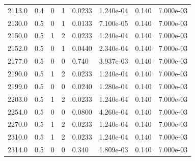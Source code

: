 \documentclass[preview]{standalone}
\begin{document}
{{{{{\begin{tabular}{L{1.2cm}C{1.2cm} C{0.3cm}C{0.5cm} C{1.4cm}C{1.4cm} C{1.4cm}C{1.4cm}}
  2113.0  &   0.4  & 0     &  1 &  0.0233  & 1.240e-04  & 0.140 &  7.000e-03   \\ 
  2130.0  &   0.5  & 0     &  1 &  0.0133  & 7.100e-05  & 0.140 &  7.000e-03   \\ 
  2150.0  &   0.5  & 1     &  2 &  0.0233  & 1.240e-04  & 0.140 &  7.000e-03   \\ 
  2152.0  &   0.5  & 0     &  1 &  0.0440  & 2.340e-04  & 0.140 &  7.000e-03   \\ 
  2177.0  &   0.5  & 0     &  0 &  0.740  & 3.937e-03  & 0.140 &  7.000e-03   \\ 
  2190.0  &   0.5  & 1     &  2 &  0.0233  & 1.240e-04  & 0.140 &  7.000e-03   \\ 
  2199.0  &   0.5  & 0     &  0 &  0.0240  & 1.280e-04  & 0.140 &  7.000e-03   \\ 
  2203.0  &   0.5  & 1     &  2 &  0.0233  & 1.240e-04  & 0.140 &  7.000e-03   \\ 
  2254.0  &   0.5  & 0     &  0 &  0.0800  & 4.260e-04  & 0.140 &  7.000e-03   \\ 
  2270.0  &   0.5  & 1     &  2 &  0.0233  & 1.240e-04  & 0.140 &  7.000e-03   \\ 
  2310.0  &   0.5  & 1     &  2 &  0.0233  & 1.240e-04  & 0.140 &  7.000e-03   \\ 
  2314.0  &   0.5  & 0     &  0 &  0.340  & 1.809e-03  & 0.140 &  7.000e-03   \\ 
\hline 
\end{tabular} 

}}}}}
\end{document}
